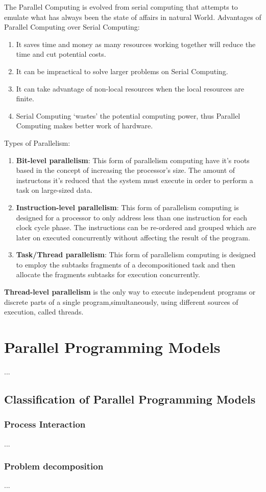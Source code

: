 The Parallel Computing is evolved from serial computing that attempts to emulate what has always been the state of affairs in natural World.
Advantages of Parallel Computing over Serial Computing:
\begin{enumerate}
			\item {It saves time and money as many resources working together will reduce the time and cut potential costs.}
			\item {It can be impractical to solve larger problems on Serial Computing.}
			\item {It can take advantage of non-local resources when the local resources are finite.}
			\item {Serial Computing ‘wastes’ the potential computing power, thus Parallel Computing makes better work of hardware.}
\end{enumerate}
Types of Parallelism:
\begin{enumerate}
	 \item {\textbf{Bit-level parallelism}: This form of parallelism computing have it's roots based in the concept of increasing the processor's size. The amount of instructons it's reduced that the system must execute in order to perform a task on large-sized data.}
	 \item {\textbf{Instruction-level parallelism}: This form of parallelism computing is designed for a processor to only address less than one instruction for each clock cycle phase. The instructions can be re-ordered and grouped which are later on executed concurrently without affecting the result of the program.}
	  \item {\textbf{Task/Thread parallelism}: This form of parallelism computing is designed to employ the subtasks fragments of a decompositioned task and then allocate the fragments subtasks for execution concurrently.} \parencite{book7}
\end{enumerate}   

\textbf{Thread-level parallelism} is the only way to execute independent programs or discrete parts of a single program,simultaneously, using different sources of execution, called threads.

\section{Parallel Programming Models}\label{chap:parPrgModels}

...

\newpage

\subsection{Classification of Parallel Programming Models}

\subsubsection{Process Interaction}

...\parencite[see][p4]{internet1}

\subsubsection{Problem decomposition}

...\parencite[see][p105 ff.]{book1}